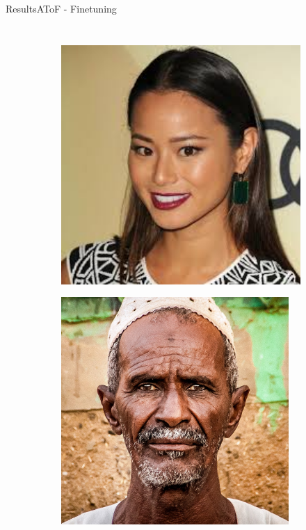 \begin{frame}{Results}{AToF - Finetuning}
\begin{columns}
\begin{figure}
\begin{subfigure}[b]{0.45\textwidth}
                \includegraphics[width=1\textwidth]{sections/malte_slides/atof2}
            \end{subfigure}
            \begin{subfigure}[b]{0.6\textwidth}
                \includegraphics[width=0.95\textwidth]{sections/malte_slides/atof3}
            \end{subfigure}
        \end{figure}
    \end{columns}
\end{frame}

